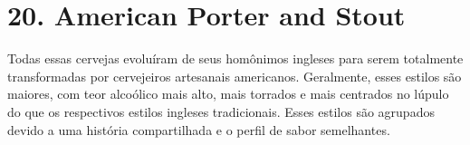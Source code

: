 \section*{20. American Porter and Stout}

Todas essas cervejas evoluíram de seus homônimos ingleses para serem totalmente transformadas por cervejeiros artesanais americanos. Geralmente, esses estilos são maiores, com teor alcoólico mais alto, mais torrados e mais centrados no lúpulo do que os respectivos estilos ingleses tradicionais. Esses estilos são agrupados devido a uma história compartilhada e o perfil de sabor semelhantes.
